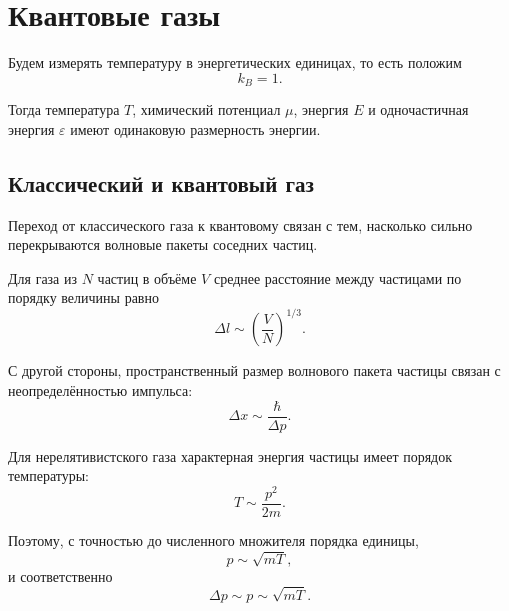 \documentclass[../final.tex]{subfiles}
\begin{document}

\chapter{Квантовые газы}


Будем измерять температуру в энергетических единицах, то есть положим
%
\begin{equation*}
    k_B = 1.
\end{equation*}

Тогда температура $T$, химический потенциал $\mu$, энергия $E$
и одночастичная энергия $\varepsilon$ имеют одинаковую размерность энергии.


\section{Классический и квантовый газ}

Переход от классического газа к квантовому связан с тем,
насколько сильно перекрываются волновые пакеты соседних частиц.

Для газа из $N$ частиц в объёме $V$ среднее расстояние между частицами
по порядку величины равно
%
\begin{equation*}
    \Delta l
    \sim
    \left(
        \frac{V}{N}
    \right)^{1/3}.
\end{equation*}

С другой стороны, пространственный размер волнового пакета частицы
связан с неопределённостью импульса:
%
\begin{equation*}
    \Delta x
    \sim
    \frac{\hbar}{\Delta p}.
\end{equation*}

Для нерелятивистского газа характерная энергия частицы имеет порядок
температуры:
%
\begin{equation*}
    T
    \sim
    \frac{p^2}{2m}.
\end{equation*}

Поэтому, с точностью до численного множителя порядка единицы,
%
\begin{equation*}
    p
    \sim
    \sqrt{mT},
\end{equation*}
%
и соответственно
%
\begin{equation*}
    \Delta p
    \sim
    p
    \sim
    \sqrt{mT}.
\end{equation*}
\end{document}
